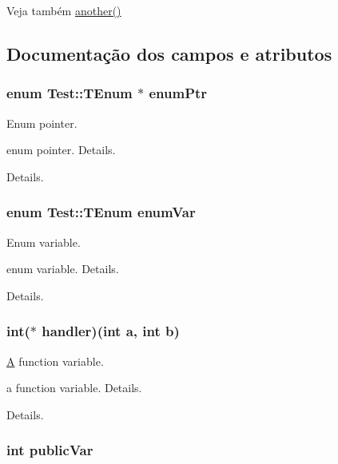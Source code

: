 \begin{DoxySeeAlso}{Veja também}
\hyperlink{class_test_a1283d836e0611ff772c1b06a31ecbbfe}{another()} 
\end{DoxySeeAlso}


\subsection{Documentação dos campos e atributos}
\hypertarget{class_test_a7c78a0b9e5e08842083ca6f3ac1243bd}{
\subsubsection[{enum\-Ptr}]{\setlength{\rightskip}{0pt plus 5cm}enum {\bf Test\-::\-T\-Enum} $\ast$ enum\-Ptr}}\label{class_test_a7c78a0b9e5e08842083ca6f3ac1243bd}


Enum pointer. 

enum pointer. Details.

Details. \hypertarget{class_test_aba61457e93a684d33eb93011cacd4202}{
\subsubsection[{enum\-Var}]{\setlength{\rightskip}{0pt plus 5cm}enum {\bf Test\-::\-T\-Enum} enum\-Var}}\label{class_test_aba61457e93a684d33eb93011cacd4202}


Enum variable. 

enum variable. Details.

Details. \hypertarget{class_test_a89099c88d24a6f3036140ecaccd2bb85}{
\subsubsection[{handler}]{\setlength{\rightskip}{0pt plus 5cm}int($\ast$ handler)(int a, int b)}}\label{class_test_a89099c88d24a6f3036140ecaccd2bb85}


\hyperlink{class_a}{A} function variable. 

a function variable. Details.

Details. \hypertarget{class_test_a292887ac25652b1d8448430f583378c3}{
\subsubsection[{public\-Var}]{\setlength{\rightskip}{0pt plus 5cm}int public\-Var}}\label{class_test_a292887ac25652b1d8448430f583378c3}


